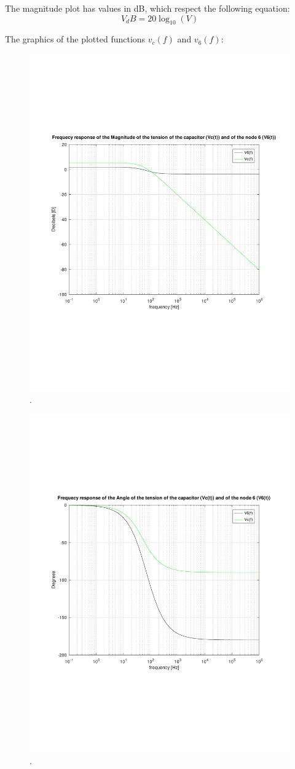 The magnitude plot has values in dB, which respect the following equation:
\begin{equation}
	V_dB = 20\log_10(V)
\end{equation}

The graphics of the plotted functions $v_c(f)$ and $v_6(f)$:


\begin{figure}[H] \centering
\includegraphics[width=0.6\linewidth]{magnitude_response.pdf}
\caption{.}
\label{fig:rc4}
\end{figure}



\begin{figure}[H] \centering
\includegraphics[width=0.6\linewidth]{angle_response.pdf}
\caption{.}
\label{fig:rc5}
\end{figure}

